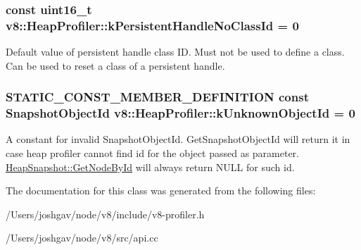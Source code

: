 \subsubsection[{\texorpdfstring{k\+Persistent\+Handle\+No\+Class\+Id}{kPersistentHandleNoClassId}}]{\setlength{\rightskip}{0pt plus 5cm}const uint16\+\_\+t v8\+::\+Heap\+Profiler\+::k\+Persistent\+Handle\+No\+Class\+Id = 0\hspace{0.3cm}{\ttfamily [static]}}\hypertarget{classv8_1_1_heap_profiler_a272c9af3ea5cd90a2737af3d22a7eb78}{}\label{classv8_1_1_heap_profiler_a272c9af3ea5cd90a2737af3d22a7eb78}
Default value of persistent handle class ID. Must not be used to define a class. Can be used to reset a class of a persistent handle. 
\subsubsection[{\texorpdfstring{k\+Unknown\+Object\+Id}{kUnknownObjectId}}]{\setlength{\rightskip}{0pt plus 5cm}S\+T\+A\+T\+I\+C\+\_\+\+C\+O\+N\+S\+T\+\_\+\+M\+E\+M\+B\+E\+R\+\_\+\+D\+E\+F\+I\+N\+I\+T\+I\+ON const Snapshot\+Object\+Id v8\+::\+Heap\+Profiler\+::k\+Unknown\+Object\+Id = 0\hspace{0.3cm}{\ttfamily [static]}}\hypertarget{classv8_1_1_heap_profiler_a40f41d75716ff1b335e95521296e027d}{}\label{classv8_1_1_heap_profiler_a40f41d75716ff1b335e95521296e027d}
A constant for invalid Snapshot\+Object\+Id. Get\+Snapshot\+Object\+Id will return it in case heap profiler cannot find id for the object passed as parameter. \hyperlink{classv8_1_1_heap_snapshot_a012e67b88ae332bf76bd813b8726819a}{Heap\+Snapshot\+::\+Get\+Node\+By\+Id} will always return N\+U\+LL for such id. 

The documentation for this class was generated from the following files\+:\begin{DoxyCompactItemize}
\item 
/\+Users/joshgav/node/v8/include/v8-\/profiler.\+h\item 
/\+Users/joshgav/node/v8/src/api.\+cc\end{DoxyCompactItemize}
